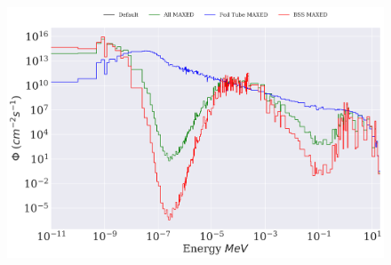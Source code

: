 
\begin{figure}[htb]
\includegraphics[height=4in]{tex/figures/unfolded_mx.png}
\caption[]{}
\label{fig:unfolded_mx}
\end{figure}


